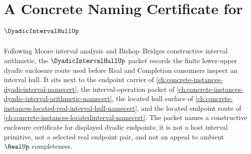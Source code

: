 \chapter{A Concrete Naming Certificate for $\DyadicIntervalHullUp$}
\label{ch:concrete-instances-dyadic-interval-hull-namecert}

Following Moore interval analysis and Bishop--Bridges constructive interval arithmetic, the $\DyadicIntervalHullUp$ packet records the finite lower-upper dyadic enclosure route used before Real and Completion consumers inspect an interval hull. It sits next to the endpoint carrier of \autoref{ch:concrete-instances-dyadicinterval-namecert}, the interval-operation packet of \autoref{ch:concrete-instances-dyadic-interval-arithmetic-namecert}, the located hull surface of \autoref{ch:concrete-instances-located-real-interval-hull-namecert}, and the located endpoint route of \autoref{ch:concrete-instances-locatedinterval-namecert}. The packet names a constructive enclosure certificate for displayed dyadic endpoints; it is not a host interval primitive, not a selected real endpoint pair, and not an appeal to ambient $\RealUp$ completeness.

